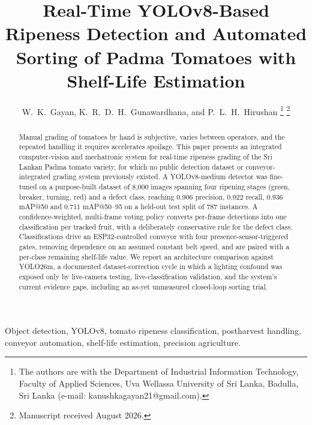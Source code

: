 \documentclass[journal]{IEEEtran}
\begin{document}
\title{Real-Time YOLOv8-Based Ripeness Detection and Automated Sorting of Padma Tomatoes with Shelf-Life Estimation}

\author{W.~K.~Gayan, K.~R.~D.~H.~Gunawardhana, and P.~L.~H.~Hirushan
\thanks{The authors are with the Department of Industrial Information Technology, Faculty of Applied Sciences, Uva Wellassa University of Sri Lanka, Badulla, Sri Lanka (e-mail: kanushkagayan21@gmail.com).}
\thanks{Manuscript received August 2026.}}


\maketitle

\begin{abstract}
Manual grading of tomatoes by hand is subjective, varies between operators, and the repeated handling it requires accelerates spoilage. This paper presents an integrated computer-vision and mechatronic system for real-time ripeness grading of the Sri Lankan Padma tomato variety, for which no public detection dataset or conveyor-integrated grading system previously existed. A YOLOv8-medium detector was fine-tuned on a purpose-built dataset of 8{,}000 images spanning four ripening stages (green, breaker, turning, red) and a defect class, reaching 0.906 precision, 0.922 recall, 0.936 mAP@50 and 0.711 mAP@50--95 on a held-out test split of 787 instances. A confidence-weighted, multi-frame voting policy converts per-frame detections into one classification per tracked fruit, with a deliberately conservative rule for the defect class. Classifications drive an ESP32-controlled conveyor with four presence-sensor-triggered gates, removing dependence on an assumed constant belt speed, and are paired with a per-class remaining shelf-life value. We report an architecture comparison against YOLO26m, a documented dataset-correction cycle in which a lighting confound was exposed only by live-camera testing, live-classification validation, and the system's current evidence gaps, including an as-yet unmeasured closed-loop sorting trial.
\end{abstract}

\begin{IEEEkeywords}
Object detection, YOLOv8, tomato ripeness classification, postharvest handling, conveyor automation, shelf-life estimation, precision agriculture.
\end{IEEEkeywords}
\end{document}
